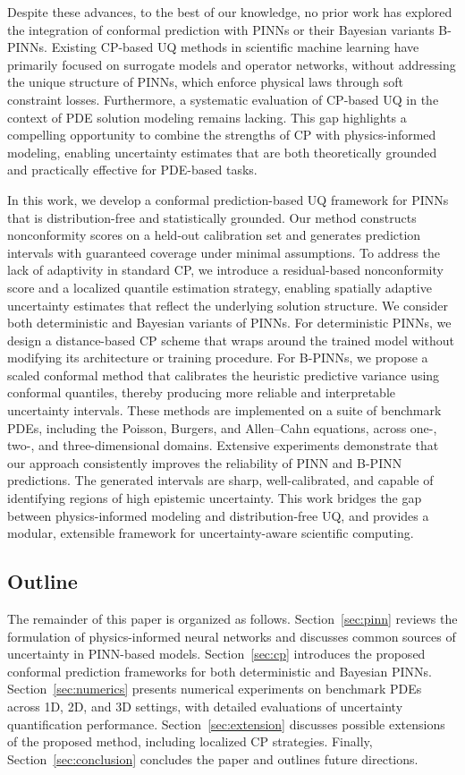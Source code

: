 \documentclass[preprint,12pt]{elsarticle}
\begin{document}
Despite these advances, to the best of our knowledge, no prior work has explored the integration of conformal prediction with PINNs or their Bayesian variants B-PINNs. Existing CP-based UQ methods in scientific machine learning have primarily focused on surrogate models and operator networks, without addressing the unique structure of PINNs, which enforce physical laws through soft constraint losses. Furthermore, a systematic evaluation of CP-based UQ in the context of PDE solution modeling remains lacking. This gap highlights a compelling opportunity to combine the strengths of CP with physics-informed modeling, enabling uncertainty estimates that are both theoretically grounded and practically effective for PDE-based tasks.

% 
In this work, we develop a conformal prediction-based UQ framework for PINNs that is distribution-free and statistically grounded. Our method constructs nonconformity scores on a held-out calibration set and generates prediction intervals with guaranteed coverage under minimal assumptions. To address the lack of adaptivity in standard CP, we introduce a residual-based nonconformity score and a localized quantile estimation strategy, enabling spatially adaptive uncertainty estimates that reflect the underlying solution structure. We consider both deterministic and Bayesian variants of PINNs. For deterministic PINNs, we design a distance-based CP scheme that wraps around the trained model without modifying its architecture or training procedure. For B-PINNs, we propose a scaled conformal method that calibrates the heuristic predictive variance using conformal quantiles, thereby producing more reliable and interpretable uncertainty intervals. These methods are implemented on a suite of benchmark PDEs, including the Poisson, Burgers, and Allen–Cahn equations, across one-, two-, and three-dimensional domains. Extensive experiments demonstrate that our approach consistently improves the reliability of PINN and B-PINN predictions. The generated intervals are sharp, well-calibrated, and capable of identifying regions of high epistemic uncertainty. This work bridges the gap between physics-informed modeling and distribution-free UQ, and provides a modular, extensible framework for uncertainty-aware scientific computing.

\subsection*{Outline}
The remainder of this paper is organized as follows. Section~\ref{sec:pinn} reviews the formulation of physics-informed neural networks and discusses common sources of uncertainty in PINN-based models. Section~\ref{sec:cp} introduces the proposed conformal prediction frameworks for both deterministic and Bayesian PINNs. Section~\ref{sec:numerics} presents numerical experiments on benchmark PDEs across 1D, 2D, and 3D settings, with detailed evaluations of uncertainty quantification performance. Section~\ref{sec:extension} discusses possible extensions of the proposed method, including localized CP strategies. Finally, Section~\ref{sec:conclusion} concludes the paper and outlines future directions.
\end{document}

